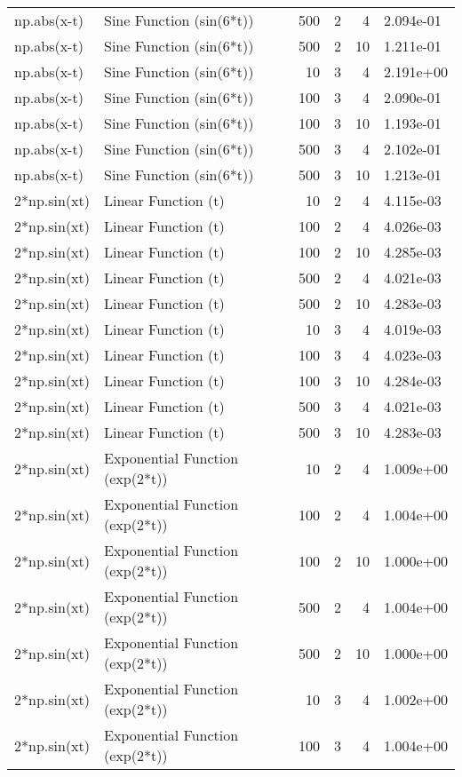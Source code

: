\begin{tabular}{llrrrl}
np.abs(x-t) & Sine Function (sin(6*t)) & 500 & 2 & 4 & 2.094e-01 \\
np.abs(x-t) & Sine Function (sin(6*t)) & 500 & 2 & 10 & 1.211e-01 \\
np.abs(x-t) & Sine Function (sin(6*t)) & 10 & 3 & 4 & 2.191e+00 \\
np.abs(x-t) & Sine Function (sin(6*t)) & 100 & 3 & 4 & 2.090e-01 \\
np.abs(x-t) & Sine Function (sin(6*t)) & 100 & 3 & 10 & 1.193e-01 \\
np.abs(x-t) & Sine Function (sin(6*t)) & 500 & 3 & 4 & 2.102e-01 \\
np.abs(x-t) & Sine Function (sin(6*t)) & 500 & 3 & 10 & 1.213e-01 \\
2*np.sin(xt) & Linear Function (t) & 10 & 2 & 4 & 4.115e-03 \\
2*np.sin(xt) & Linear Function (t) & 100 & 2 & 4 & 4.026e-03 \\
2*np.sin(xt) & Linear Function (t) & 100 & 2 & 10 & 4.285e-03 \\
2*np.sin(xt) & Linear Function (t) & 500 & 2 & 4 & 4.021e-03 \\
2*np.sin(xt) & Linear Function (t) & 500 & 2 & 10 & 4.283e-03 \\
2*np.sin(xt) & Linear Function (t) & 10 & 3 & 4 & 4.019e-03 \\
2*np.sin(xt) & Linear Function (t) & 100 & 3 & 4 & 4.023e-03 \\
2*np.sin(xt) & Linear Function (t) & 100 & 3 & 10 & 4.284e-03 \\
2*np.sin(xt) & Linear Function (t) & 500 & 3 & 4 & 4.021e-03 \\
2*np.sin(xt) & Linear Function (t) & 500 & 3 & 10 & 4.283e-03 \\
2*np.sin(xt) & Exponential Function (exp(2*t)) & 10 & 2 & 4 & 1.009e+00 \\
2*np.sin(xt) & Exponential Function (exp(2*t)) & 100 & 2 & 4 & 1.004e+00 \\
2*np.sin(xt) & Exponential Function (exp(2*t)) & 100 & 2 & 10 & 1.000e+00 \\
2*np.sin(xt) & Exponential Function (exp(2*t)) & 500 & 2 & 4 & 1.004e+00 \\
2*np.sin(xt) & Exponential Function (exp(2*t)) & 500 & 2 & 10 & 1.000e+00 \\
2*np.sin(xt) & Exponential Function (exp(2*t)) & 10 & 3 & 4 & 1.002e+00 \\
2*np.sin(xt) & Exponential Function (exp(2*t)) & 100 & 3 & 4 & 1.004e+00 \\

\end{tabular}
